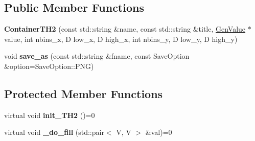 \subsection*{Public Member Functions}
\begin{DoxyCompactItemize}
\item 
\hypertarget{classfv_1_1root_1_1ContainerTH2_a2b0419d5acc2d1c0f5812105b0509ff0}{}\label{classfv_1_1root_1_1ContainerTH2_a2b0419d5acc2d1c0f5812105b0509ff0} 
{\bfseries Container\+T\+H2} (const std\+::string \&name, const std\+::string \&title, \hyperlink{classfv_1_1GenValue}{Gen\+Value} $\ast$value, int nbins\+\_\+x, D low\+\_\+x, D high\+\_\+x, int nbins\+\_\+y, D low\+\_\+y, D high\+\_\+y)
\item 
\hypertarget{classfv_1_1root_1_1ContainerTH2_ac22e15adea4f5338e2592fc0a239771d}{}\label{classfv_1_1root_1_1ContainerTH2_ac22e15adea4f5338e2592fc0a239771d} 
void {\bfseries save\+\_\+as} (const std\+::string \&fname, const Save\+Option \&option=Save\+Option\+::\+P\+NG)
\end{DoxyCompactItemize}
\subsection*{Protected Member Functions}
\begin{DoxyCompactItemize}
\item 
\hypertarget{classfv_1_1root_1_1ContainerTH2_af9056cafd1a764a54dfd17ca417ed0db}{}\label{classfv_1_1root_1_1ContainerTH2_af9056cafd1a764a54dfd17ca417ed0db} 
virtual void {\bfseries init\+\_\+\+T\+H2} ()=0
\item 
\hypertarget{classfv_1_1root_1_1ContainerTH2_a7a52f5fa3875d7f44645cc206902d9c2}{}\label{classfv_1_1root_1_1ContainerTH2_a7a52f5fa3875d7f44645cc206902d9c2} 
virtual void {\bfseries \+\_\+do\+\_\+fill} (std\+::pair$<$ V, V $>$ \&val)=0
\end{DoxyCompactItemize}
